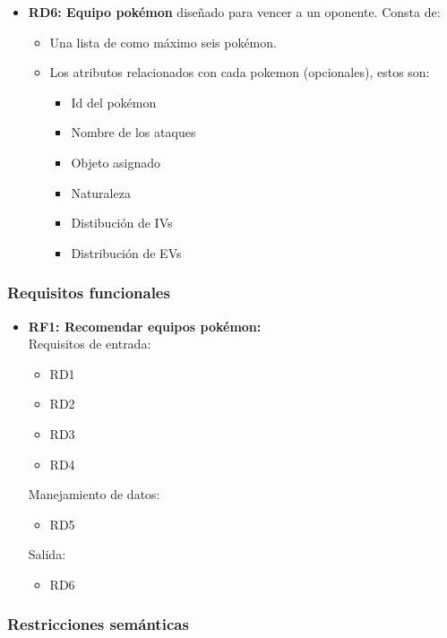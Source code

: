 \begin{itemize}
		\item \textbf{RD6: Equipo pokémon} diseñado para vencer a un oponente.
			Consta de:
			\begin{itemize}
				\item Una lista de como máximo seis pokémon.
				\item Los atributos relacionados con cada pokemon
					(opcionales), estos son:
					\begin{itemize}
						\item Id del pokémon
						\item Nombre de los ataques
						\item Objeto asignado
						\item Naturaleza
						\item Distibución de IVs
						\item Distribución de EVs
					\end{itemize}
			\end{itemize}
	\end{itemize}


\subsubsection{Requisitos funcionales}

	\begin{itemize}
		\item \textbf{RF1: Recomendar equipos pokémon:}\\

		Requisitos de entrada:
		\begin{itemize}
			\item RD1
			\item RD2
			\item RD3
			\item RD4
		\end{itemize}

		Manejamiento de datos:
		\begin{itemize}
			\item RD5
		\end{itemize}

		Salida:
		\begin{itemize}
			\item RD6
		\end{itemize}
	\end{itemize}


\subsubsection{Restricciones semánticas}
